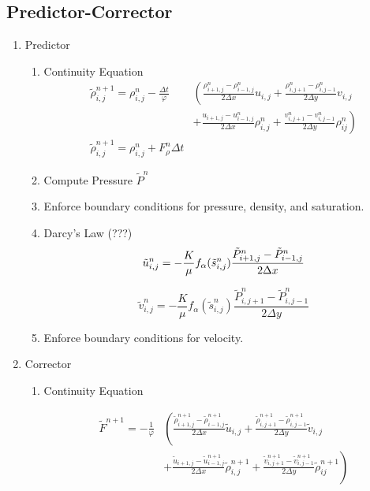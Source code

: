 \documentclass[a4paper,12pt]{article}
\begin{document}
\subsection{Predictor-Corrector}

\begin{enumerate}
    \item Predictor
        \begin{enumerate}
            \item Continuity Equation
\begin{align*}
    \tilde \rho_{i, j}^{n+1} = \rho_{i, j}^n
    - \frac{\Delta t}{\varphi} &\left( 
  \frac{\rho_{i+1, j}^n - \rho_{i-1,j}^n}{2\Delta x} u_{i,j}
+ \frac{\rho_{i, j+1}^n - \rho_{i,j-1}^n}{2\Delta y} v_{i,j}
\right. \\
                             &\left.+
  \frac{u_{i+1, j} - u_{i-1,j}^n}{2\Delta x} \rho_{i,j}^n
+ \frac{v_{i, j+1}^n - v_{i,j-1}^n}{2\Delta y} \rho_{ij}^n
    \right) \\
    \tilde \rho_{i, j}^{n + 1}
    = \rho_{i, j}^n + F_\rho^n \Delta t 
\end{align*}

            \item Compute Pressure \(\tilde P^n\)
            \item Enforce boundary conditions for pressure,
                density, and saturation.

            \item Darcy's Law (???)
\[
    \tilde u_{i,j}^n = -\frac{K}{\mu}
    f_\alpha (\tilde s_{i, j}^n)
    \frac{\tilde P_{i + 1, j}^n - \tilde P_{i - 1, j}^n}
    {2\Delta x} \\
\] 

\[
    \tilde v_{i,j}^n = -\frac{K}{\mu}
    f_\alpha(\tilde s_{i, j}^n)
    \frac{\tilde P_{i, j + 1}^n
    - \tilde P_{i, j - 1}^n}{2\Delta y}
\] 
            \item Enforce boundary conditions for velocity.
        \end{enumerate}

    \item Corrector
        \begin{enumerate}
            \item Continuity Equation

\begin{align*}
    \tilde F^{n + 1} = -\frac{1}{\varphi} &\left( 
\frac{\tilde \rho_{i+1, j}^{n + 1}
    - \tilde \rho_{i-1,j}^{n + 1} }{2\Delta x} \tilde u_{i,j}
+ \frac{\tilde \rho_{i, j+1}^{n + 1}
    - \tilde \rho_{i,j-1}^{n + 1} }{2\Delta y} \tilde v_{i,j}
\right.\\
                                          &\left.
+ \frac{\tilde u_{i+1, j}
    - \tilde u_{i-1,j}^{n + 1}}{2
\Delta x} \tilde \rho_{i,j}^{n + 1}
+ \frac{\tilde v_{i, j+1}^{n + 1}
- \tilde v_{i,j-1}^{n + 1}}{2\Delta y}
\tilde \rho_{ij}^{n + 1}
    \right) 
\end{align*}


\end{enumerate}
\end{enumerate}
\end{document}
